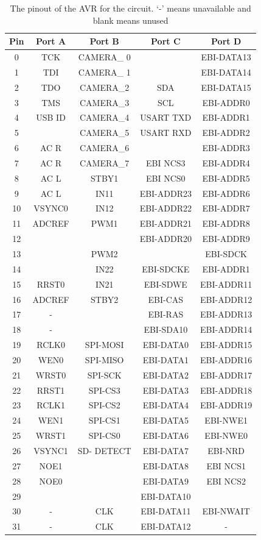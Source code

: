 \begin{table}
\centering
\caption{The pinout of the AVR for the circuit. `-' means unavailable and blank means unused}
\label{table:UC3C:Pinout}
\begin{tabular}{ccccc}\toprule%
Pin & Port A & Port B & Port C & Port D \\ \toprule
0&TCK&CAMERA\_ 0&&EBI-DATA13\\ \midrule
1&TDI&CAMERA\_ 1&&EBI-DATA14\\\midrule
2&TDO&CAMERA\_2&SDA&EBI-DATA15\\\midrule
3&TMS&CAMERA\_3&SCL&EBI-ADDR0\\\midrule
4&USB ID&CAMERA\_4&USART TXD&EBI-ADDR1\\\midrule
5&&CAMERA\_5&USART RXD&EBI-ADDR2\\\midrule
6&AC R&CAMERA\_6&&EBI-ADDR3\\\midrule
7&AC R&CAMERA\_7&EBI NCS3&EBI-ADDR4\\\midrule
8&AC L&STBY1&EBI NCS0&EBI-ADDR5\\\midrule
9&AC L&IN11&EBI-ADDR23&EBI-ADDR6\\\midrule
10&VSYNC0&IN12&EBI-ADDR22&EBI-ADDR7\\\midrule
11&ADCREF&PWM1&EBI-ADDR21&EBI-ADDR8\\\midrule
12&&&EBI-ADDR20&EBI-ADDR9\\\midrule
13&&PWM2&&EBI-SDCK\\\midrule
14&&IN22&EBI-SDCKE&EBI-ADDR1\\\midrule
15&RRST0&IN21&EBI-SDWE&EBI-ADDR11\\\midrule
16&ADCREF&STBY2&EBI-CAS&EBI-ADDR12\\\midrule
17&-&&EBI-RAS&EBI-ADDR13\\\midrule
18&-&&EBI-SDA10&EBI-ADDR14\\\midrule
19&RCLK0&SPI-MOSI&EBI-DATA0&EBI-ADDR15\\\midrule
20&WEN0&SPI-MISO&EBI-DATA1&EBI-ADDR16\\\midrule
21&WRST0&SPI-SCK&EBI-DATA2&EBI-ADDR17\\\midrule
22&RRST1&SPI-CS3&EBI-DATA3&EBI-ADDR18\\\midrule
23&RCLK1&SPI-CS2&EBI-DATA4&EBI-ADDR19\\\midrule
24&WEN1&SPI-CS1&EBI-DATA5&EBI-NWE1\\\midrule
25&WRST1&SPI-CS0&EBI-DATA6&EBI-NWE0\\\midrule
26&VSYNC1&SD- DETECT&EBI-DATA7&EBI-NRD\\\midrule
27&NOE1&&EBI-DATA8&EBI NCS1\\\midrule
28&NOE0&&EBI-DATA9&EBI NCS2\\\midrule
29&&&EBI-DATA10&\\\midrule
30&-&CLK&EBI-DATA11&EBI-NWAIT\\\midrule
31&-&CLK&EBI-DATA12&-\\ \bottomrule

\end{tabular}
\end{table}

